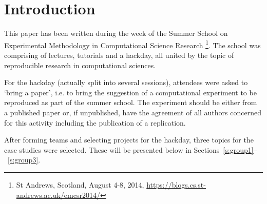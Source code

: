 \section{Introduction}
\label{s:intro}

This paper has been written during the week of the Summer School
on Experimental Methodology in Computational Science Research
\footnote{St Andrews, Scotland, August 4-8, 2014,
\url{https://blogs.cs.st-andrews.ac.uk/emcsr2014/}}. The 
school was comprising of lectures, tutorials and a hackday,
all united by the topic of reproducible research in computational
sciences. 

For the hackday (actually split into several sessions), attendees 
were asked to `bring a paper', i.e. to bring the suggestion of a 
computational experiment to be reproduced as part of the summer school. 
The experiment should be either from a published paper or, if unpublished, 
have the agreement of all authors concerned for this activity including 
the publication of a replication. 

After forming teams and selecting projects for the hackday, three
topics for the case studies were selected. These will be presented below
in Sections~\ref{s:group1}--~\ref{s:group3}.




